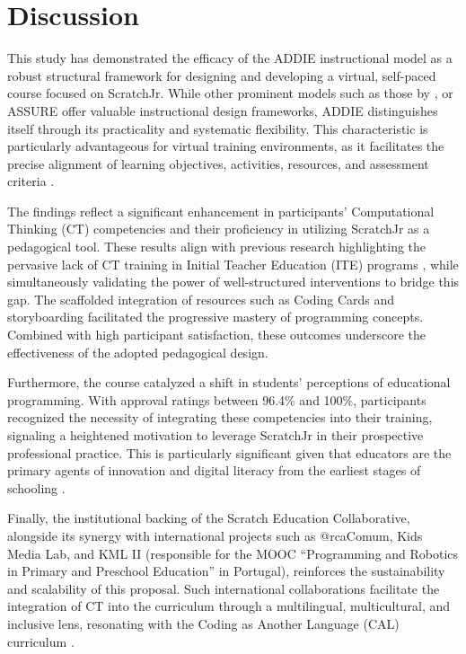 \documentclass[english]{textolivre}
\begin{document}
\section{Discussion}
This study has demonstrated the efficacy of the ADDIE instructional model as a robust structural framework for designing and developing a virtual, self-paced course focused on ScratchJr. While other prominent models such as those by \textcite{dick2009systematic,gagne2005principles}, or ASSURE \cite{heinich2002instructional} offer valuable instructional design frameworks, ADDIE distinguishes itself through its practicality and systematic flexibility. This characteristic is particularly advantageous for virtual training environments, as it facilitates the precise alignment of learning objectives, activities, resources, and assessment criteria \cite{hadi2017development}.

The findings reflect a significant enhancement in participants' Computational Thinking (CT) competencies and their proficiency in utilizing ScratchJr as a pedagogical tool. These results align with previous research highlighting the pervasive lack of CT training in Initial Teacher Education (ITE) programs \cite{bers2018scratchjr}, while simultaneously validating the power of well-structured interventions to bridge this gap. The scaffolded integration of resources such as Coding Cards and storyboarding facilitated the progressive mastery of programming concepts. Combined with high participant satisfaction, these outcomes underscore the effectiveness of the adopted pedagogical design.

Furthermore, the course catalyzed a shift in students’ perceptions of educational programming. With approval ratings between 96.4\% and 100\%, participants recognized the necessity of integrating these competencies into their training, signaling a heightened motivation to leverage ScratchJr in their prospective professional practice. This is particularly significant given that educators are the primary agents of innovation and digital literacy from the earliest stages of schooling \cite{bers2014computational}.

Finally, the institutional backing of the Scratch Education Collaborative, alongside its synergy with international projects such as @rcaComum, Kids Media Lab, and KML II (responsible for the MOOC “Programming and Robotics in Primary and Preschool Education” in Portugal), reinforces the sustainability and scalability of this proposal. Such international collaborations facilitate the integration of CT into the curriculum through a multilingual, multicultural, and inclusive lens, resonating with the Coding as Another Language (CAL) curriculum \cite{bers2022coding}.
\end{document}
